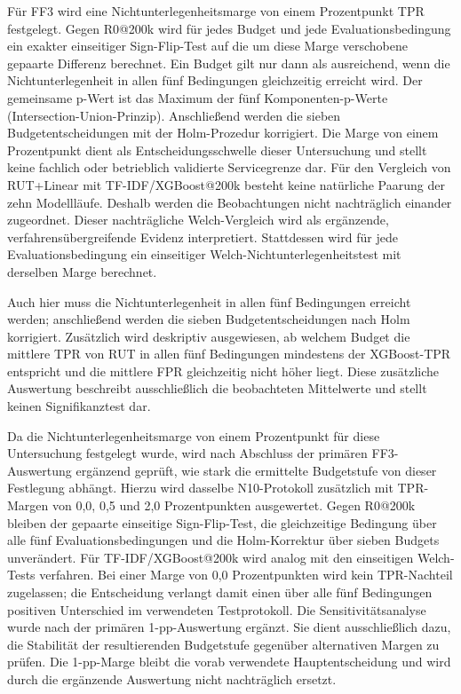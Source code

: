 Für FF3 wird eine Nichtunterlegenheitsmarge von einem Prozentpunkt TPR festgelegt. Gegen
R0@200k wird für jedes Budget und jede Evaluationsbedingung ein exakter einseitiger
Sign-Flip-Test auf die um diese Marge verschobene gepaarte Differenz berechnet. Ein Budget
gilt nur dann als ausreichend, wenn die Nichtunterlegenheit in allen fünf Bedingungen
gleichzeitig erreicht wird. Der gemeinsame p-Wert ist das Maximum der fünf
Komponenten-p-Werte (Intersection-Union-Prinzip). Anschließend werden die sieben Budgetentscheidungen mit der
Holm-Prozedur korrigiert. Die Marge von einem Prozentpunkt dient als Entscheidungsschwelle
dieser Untersuchung und stellt keine fachlich oder betrieblich validierte Servicegrenze dar. Für den Vergleich von RUT+Linear mit TF-IDF/XGBoost@200k besteht keine natürliche
Paarung der zehn Modellläufe. Deshalb werden die Beobachtungen nicht nachträglich einander
zugeordnet. Dieser nachträgliche Welch-Vergleich wird als ergänzende, verfahrensübergreifende
Evidenz interpretiert. Stattdessen wird für jede Evaluationsbedingung ein einseitiger
Welch-Nichtunterlegenheitstest mit derselben Marge berechnet. 

Auch hier muss die
Nichtunterlegenheit in allen fünf Bedingungen erreicht werden; anschließend werden die sieben
Budgetentscheidungen nach Holm korrigiert. Zusätzlich wird deskriptiv ausgewiesen, ab welchem Budget die mittlere TPR von RUT in allen
fünf Bedingungen mindestens der XGBoost-TPR entspricht und die mittlere FPR gleichzeitig
nicht höher liegt. Diese zusätzliche Auswertung beschreibt ausschließlich die beobachteten
Mittelwerte und stellt keinen Signifikanztest dar.

Da die Nichtunterlegenheitsmarge von einem Prozentpunkt für diese Untersuchung festgelegt
wurde, wird nach Abschluss der primären FF3-Auswertung ergänzend geprüft, wie stark die
ermittelte Budgetstufe von dieser Festlegung abhängt. Hierzu wird dasselbe N10-Protokoll
zusätzlich mit TPR-Margen von 0,0, 0,5 und 2,0 Prozentpunkten ausgewertet. Gegen R0@200k
bleiben der gepaarte einseitige Sign-Flip-Test, die gleichzeitige Bedingung über alle fünf
Evaluationsbedingungen und die Holm-Korrektur über sieben Budgets unverändert. Für
TF-IDF/XGBoost@200k wird analog mit den einseitigen Welch-Tests verfahren. Bei einer
Marge von 0,0 Prozentpunkten wird kein TPR-Nachteil zugelassen; die Entscheidung verlangt
damit einen über alle fünf Bedingungen positiven Unterschied im verwendeten Testprotokoll. Die Sensitivitätsanalyse wurde nach der primären 1-pp-Auswertung ergänzt. Sie dient
ausschließlich dazu, die Stabilität der resultierenden Budgetstufe gegenüber alternativen Margen
zu prüfen. Die 1-pp-Marge bleibt die vorab verwendete Hauptentscheidung und wird durch die
ergänzende Auswertung nicht nachträglich ersetzt.

